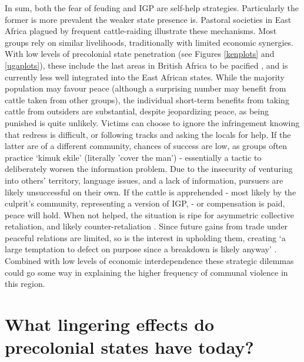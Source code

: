In sum, both the fear of feuding and IGP are self-help strategies. Particularly
the former is more prevalent the weaker state presence is. Pastoral societies in
East Africa plagued by frequent cattle-raiding illustrate these mechanisms. Most
groups rely on similar livelihoods, traditionally with limited economic
synergies. With low levels of precolonial state penetration (see Figures
\ref{kenplots} and \ref{ugaplots}), these include the last areas in British
Africa to be pacified \citep{Lamphear1992}, and is currently less well
integrated into the East African states. While the majority population may
favour peace (although a surprising number may benefit from cattle taken from
other groups), the individual short-term benefits from taking cattle from
outsiders are substantial, despite jeopardizing peace, as being punished is
quite unlikely. Victims can choose to ignore the infringement knowing that
redress is difficult, or following tracks and asking the locals for help. If the
latter are of a different community, chances of success are low, as groups often
practice `kimuk ekile' (literally 'cover the man') - essentially a tactic to
deliberately worsen the information problem. Due to the insecurity of venturing
into others’ territory, language issues, and a lack of information, pursuers are
likely unsuccessful on their own. If the cattle is apprehended - most likely by
the culprit's community, representing a version of IGP, - or compensation is
paid, peace will hold. When not helped, the situation is ripe for asymmetric
collective retaliation, and likely counter-retaliation
\citep[104ff]{Eaton_2008}. Since future gains from trade under peaceful
relations are limited, so is the interest in upholding them, creating ‘a large
temptation to defect on purpose since a breakdown is likely anyway’
\citep[724]{Fearon_1996}. Combined with low levels of economic interdependence
these strategic dilemmas could go some way in explaining the higher frequency of
communal violence in this region. 







 
\section{What lingering effects do precolonial states have today?}
\label{What lingering effects do precolonial states have today?}

